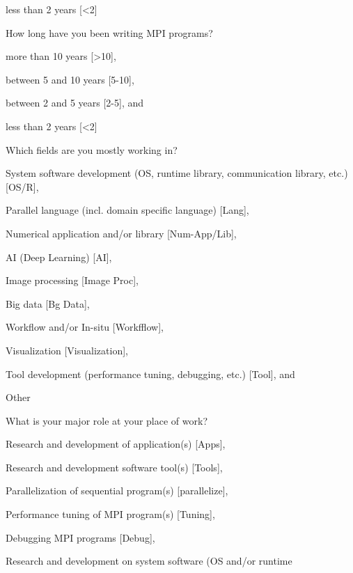 \documentclass[preprint,5p,times]{elsarticle}
\begin{document}
{{\begin{description}
\begin{inparaenum}[{\bf C}1)]
    \item less than 2 years [\textless 2]
    \end{inparaenum}
  \item[Q6:] How long have you been writing MPI programs?
    \begin{inparaenum}[{\bf C}1)]
    \item more than 10 years [\textgreater10],
    \item between 5 and 10 years [5-10],
    \item between 2 and 5 years [2-5], and
    \item less than 2 years [\textless 2]
    \end{inparaenum}
  \item[Q7*:] Which fields are you mostly working in?
    \begin{inparaenum}[{\bf C}1)]
    \item System software development (OS, runtime library, communication
      library, etc.) [OS/R],
    \item Parallel language (incl. domain specific language) [Lang],
    \item Numerical application and/or library [Num-App/Lib],
    \item AI (Deep Learning) [AI],
    \item Image processing [Image Proc],
    \item Big data [Bg Data],
    \item Workflow and/or In-situ [Workfflow],
    \item Visualization [Visualization],
    \item Tool development (performance tuning, debugging, etc.)
      [Tool], and
    \item Other
    \end{inparaenum}
  \item[Q8*:] What is your major role at your place of work?
    \begin{inparaenum}[{\bf C}1)]
    \item Research and development of application(s) [Apps],
    \item Research and development software tool(s) [Tools],
    \item Parallelization of sequential program(s) [parallelize],
    \item Performance tuning of MPI program(s) [Tuning],
    \item Debugging MPI programs [Debug],
    \item Research and development on system software (OS and/or runtime

\end{inparaenum}
\end{description}}}
\end{document}
